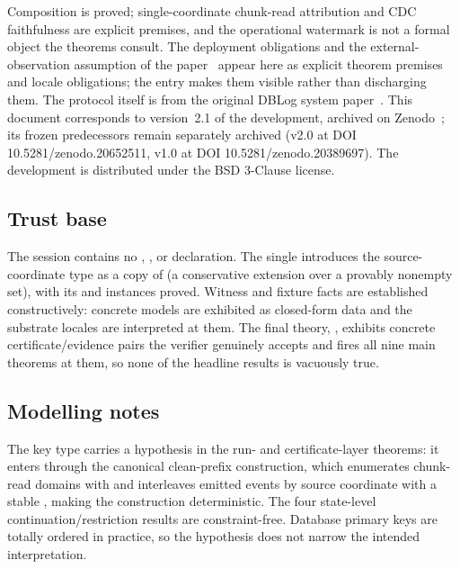 \documentclass[11pt,a4paper]{article}
\begin{document}
Composition is proved; single-coordinate chunk-read attribution and
CDC faithfulness are explicit premises, and the operational watermark
is not a formal object the theorems consult. The deployment
obligations and the external-observation assumption of the
paper~\cite{andreakis2026theoretical} appear here as explicit theorem
premises and locale obligations; the entry makes them visible rather
than discharging them. The protocol itself is from the original DBLog
system paper~\cite{andreakis2020dblog}. This document corresponds to
version~2.1 of the development, archived on
Zenodo~\cite{andreakis2026artifact}; its frozen predecessors remain
separately archived (v2.0 at DOI 10.5281/zenodo.20652511, v1.0 at DOI
10.5281/zenodo.20389697). The
development is distributed under the BSD 3-Clause license.

\subsection*{Trust base}

The session contains no , , or
 declaration. The single  introduces the
source-coordinate type as a copy of  (a conservative
extension over a provably nonempty set), with its  and
 instances proved. Witness and
fixture facts are established constructively: concrete models are
exhibited as closed-form data and the substrate locales are
interpreted at them. The final theory,
,
exhibits concrete certificate/evidence pairs the verifier genuinely
accepts and fires all nine main theorems at them, so none of the
headline results is vacuously true.

\subsection*{Modelling notes}

The key type  carries a 
hypothesis in the run- and certificate-layer theorems: it enters
through the canonical clean-prefix construction, which enumerates
chunk-read domains with
and interleaves emitted events by source coordinate with a stable
, making the construction
deterministic. The four state-level continuation/restriction results
are constraint-free. Database primary keys are totally ordered in
practice, so the hypothesis does not narrow the intended
interpretation.
\end{document}
